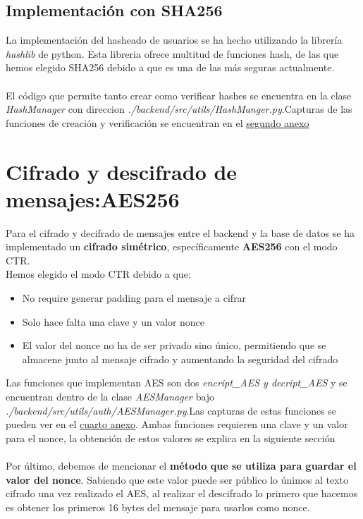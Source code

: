 \documentclass[a4paper,11pt]{article}
\begin{document}
\subsection{Implementación con SHA256}

La implementación del hasheado de usuarios se ha hecho utilizando la librería
\textit{hashlib} de python. Esta libreria ofrece multitud de funciones hash, de
las que hemos elegido SHA256 debido a que es una de las más seguras
actualmente.\\\\
El código que permite tanto crear como verificar hashes se encuentra en la clase
\textit{HashManager} con direccion
\textit{./backend/src/utils/HashManger.py}.Capturas de las funciones de creación y
verificación se encuentran en el \hyperref[sec:funcionesHash]{segundo anexo}


\section{Cifrado y descifrado de mensajes:AES256}
Para el cifrado y decifrado de mensajes entre el backend y la base de datos se ha implementado un \textbf{cifrado simétrico}, específicamente \textbf{AES256} con el modo CTR.\\
Hemos elegido el modo CTR debido a que:
\begin{itemize}
    \item No require generar padding para el mensaje a cifrar
    \item Solo hace falta una clave y un valor nonce
    \item El valor del nonce no ha de ser privado sino único, permitiendo que se almacene junto al mensaje cifrado y aumentando la seguridad del cifrado
\end{itemize}

Las funciones que implementan AES son dos \textit{encript\_AES y decript\_AES} y se encuentran dentro de la clase \textit{AESManager} bajo \textit{./backend/src/utils/auth/AESManager.py}.Las capturas de estas funciones se pueden ver en el \hyperref[sec:funcionesAES]{cuarto anexo}. Ambas funciones requieren una clave y un valor para el nonce, la obtención de estos valores se explica en la siguiente sección \\\\
Por último, debemos de mencionar el \textbf{método que se utiliza para guardar el valor del nonce}. Sabiendo  que este valor puede ser público lo únimos al texto cifrado una vez realizado el AES, al realizar el descifrado lo primero que hacemos es obtener los primeros 16 bytes del mensaje para usarlos como nonce. 
\end{document}
